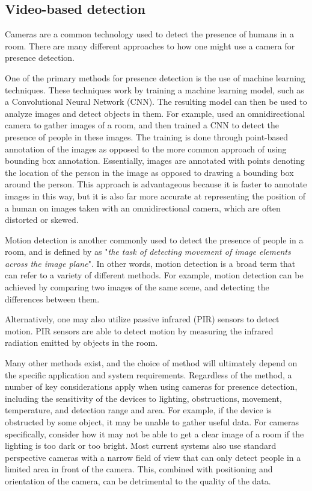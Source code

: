 \subsection{Video-based detection} \label{sec:video-based-detection}
Cameras are a common technology used to detect the presence of humans in a room.
There are many different approaches to how one might use a camera for presence detection.

One of the primary methods for presence detection is the use of machine learning techniques.
These techniques work by training a machine learning model, such as a Convolutional Neural Network (CNN).
The resulting model can then be used to analyze images and detect objects in them.
For example, \citeauthor{FUERTES2022103473}\cite{FUERTES2022103473} used an omnidirectional camera to gather images of a room, and then trained a CNN to detect the presence of people in these images.
The training is done through point-based annotation of the images as opposed to the more common approach of using bounding box annotation.
Essentially, images are annotated with points denoting the location of the person in the image as opposed to drawing a bounding box around the person.
This approach is advantageous because it is faster to annotate images in this way, but it is also far more accurate at representing the position of a human on images taken with an omnidirectional camera, which are often distorted or skewed.\cite{FUERTES2022103473}

Motion detection is another commonly used to detect the presence of people in a room, and is defined by \citeauthor{ANANDAN1988347}\cite{ANANDAN1988347} as "\textit{the task of detecting movement of image elements across the image plane}".
In other words, motion detection is a broad term that can refer to a variety of different methods.
For example, motion detection can be achieved by comparing two images of the same scene, and detecting the differences between them\cite{granath_detecting_nodate}.

Alternatively, one may also utilize passive infrared (PIR) sensors to detect motion.
PIR sensors are able to detect motion by measuring the infrared radiation emitted by objects in the room.\cite{Deiana2014}

Many other methods exist, and the choice of method will ultimately depend on the specific application and system requirements. 
Regardless of the method, a number of key considerations apply when using cameras for presence detection, including the sensitivity of the devices to lighting, obstructions, movement, temperature, and detection range and area.
For example, if the device is obstructed by some object, it may be unable to gather useful data.
For cameras specifically, consider how it may not be able to get a clear image of a room if the lighting is too dark or too bright.
Most current systems also use standard perspective cameras with a narrow field of view that can only detect people in a limited area in front of the camera\cite{FUERTES2022103473}.
This, combined with positioning and orientation of the camera, can be detrimental to the quality of the data.\cite{granath_detecting_nodate, tang_occupancy_2020}

